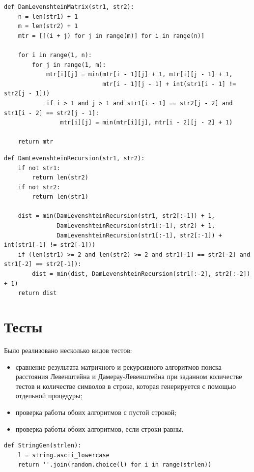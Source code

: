 \documentclass[12pt]{report}
\begin{document}
\begin{lstlisting}[label=some-code,caption=Подпрограмма поиска расстояния Дамерау-Левенштейна с помощью таблицы]
def DamLevenshteinMatrix(str1, str2):
    n = len(str1) + 1
    m = len(str2) + 1
    mtr = [[(i + j) for j in range(m)] for i in range(n)]

    for i in range(1, n):
        for j in range(1, m):
            mtr[i][j] = min(mtr[i - 1][j] + 1, mtr[i][j - 1] + 1,
                            mtr[i - 1][j - 1] + int(str1[i - 1] != str2[j - 1]))
            if i > 1 and j > 1 and str1[i - 1] == str2[j - 2] and str1[i - 2] == str2[j - 1]:
                mtr[i][j] = min(mtr[i][j], mtr[i - 2][j - 2] + 1)

    return mtr
\end{lstlisting}

\begin{lstlisting}[label=some-code,caption=Подпрограмма поиска расстояния Дамерау-Левенштейна рекурентно]
def DamLevenshteinRecursion(str1, str2):
    if not str1:
        return len(str2)
    if not str2:
        return len(str1)

    dist = min(DamLevenshteinRecursion(str1, str2[:-1]) + 1,
               DamLevenshteinRecursion(str1[:-1], str2) + 1,
               DamLevenshteinRecursion(str1[:-1], str2[:-1]) + int(str1[-1] != str2[-1]))
    if (len(str1) >= 2 and len(str2) >= 2 and str1[-1] == str2[-2] and str1[-2] == str2[-1]):
        dist = min(dist, DamLevenshteinRecursion(str1[:-2], str2[:-2]) + 1)
    return dist
\end{lstlisting}

\section{Тесты}

Было реализовано несколько видов тестов:
\begin{itemize}
	\item сравнение результата матричного и рекурсивного алгоритмов поиска расстояния Левенштейна и Дамерау-Левенштейна при заданном количестве тестов и количестве символов в строке, которая генерируется с помощью отдельной процедуры;
	\item проверка работы обоих алгоритмов с пустой строкой;
	\item проверка работы обоих алгоритмов, если строки равны.
\end{itemize}
\begin{lstlisting}[label=randStr,caption=Функция генерации строки заданной длины]
def StringGen(strlen):
    l = string.ascii_lowercase
    return ''.join(random.choice(l) for i in range(strlen))
\end{lstlisting}
\end{document}
